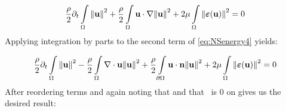  \begin{equation}\label{eq:NSenergy4}
     \frac{\rho}{2}\partial_{t}\int\limits_{\Omega}\norm{{\textbf{u}}}^2 + \frac{\rho}{2}\int\limits_{\Omega}{\textbf{u}}\cdot\nabla\norm{{\textbf{u}}}^2 + 2\mu\int\limits_{\Omega}\norm{\bm{\varepsilon}({\textbf{u}})}^2  = 0
 \end{equation}
 Applying integration by parts to the second term of \eqref{eq:NSenergy4} yields:
 
  \begin{equation}\label{eq:NSenergy5}
     \frac{\rho}{2}\partial_{t}\int\limits_{\Omega}\norm{{\textbf{u}}}^2 - \frac{\rho}{2}\int\limits_{\Omega}\nabla\cdot{\textbf{u}}\norm{{\textbf{u}}}^2 +
     \frac{\rho}{2}\int\limits_{\partial\Omega}{\textbf{u}}\cdot{\textbf{n}}\norm{{\textbf{u}}}^2 +
     2\mu\int\limits_{\Omega}\norm{\bm{\varepsilon}({\textbf{u}})}^2  = 0
 \end{equation}
 After reordering terms and again noting that  and that \bmu~is 0 on  gives us the desired result:
 
